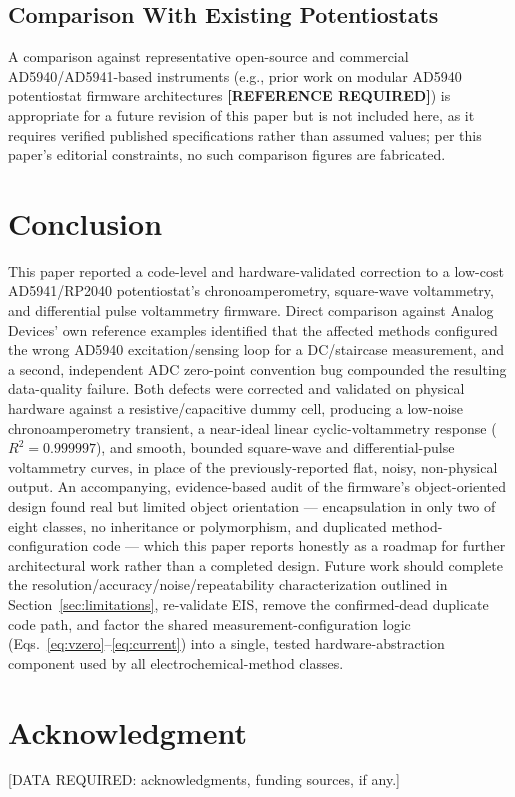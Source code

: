 \documentclass[preprint,12pt]{elsarticle}
\begin{document}
\subsection{Comparison With Existing Potentiostats}
A comparison against representative open-source and commercial AD5940/AD5941-based instruments (e.g., prior work on modular AD5940 potentiostat firmware architectures \textbf{[REFERENCE REQUIRED]}) is appropriate for a future revision of this paper but is not included here, as it requires verified published specifications rather than assumed values; per this paper's editorial constraints, no such comparison figures are fabricated.

\section{Conclusion}
This paper reported a code-level and hardware-validated correction to a low-cost AD5941/RP2040 potentiostat's chronoamperometry, square-wave voltammetry, and differential pulse voltammetry firmware. Direct comparison against Analog Devices' own reference examples identified that the affected methods configured the wrong AD5940 excitation/sensing loop for a DC/staircase measurement, and a second, independent ADC zero-point convention bug compounded the resulting data-quality failure. Both defects were corrected and validated on physical hardware against a resistive/capacitive dummy cell, producing a low-noise chronoamperometry transient, a near-ideal linear cyclic-voltammetry response ($R^2=0.999997$), and smooth, bounded square-wave and differential-pulse voltammetry curves, in place of the previously-reported flat, noisy, non-physical output. An accompanying, evidence-based audit of the firmware's object-oriented design found real but limited object orientation --- encapsulation in only two of eight classes, no inheritance or polymorphism, and duplicated method-configuration code --- which this paper reports honestly as a roadmap for further architectural work rather than a completed design. Future work should complete the resolution/accuracy/noise/repeatability characterization outlined in Section~\ref{sec:limitations}, re-validate EIS, remove the confirmed-dead duplicate code path, and factor the shared measurement-configuration logic (Eqs.~\eqref{eq:vzero}--\eqref{eq:current}) into a single, tested hardware-abstraction component used by all electrochemical-method classes.

\section*{Acknowledgment}
[DATA REQUIRED: acknowledgments, funding sources, if any.]
\end{document}
